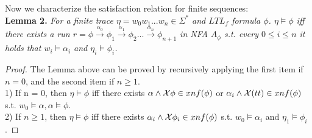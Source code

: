 Now we characterize the satisfaction relation for finite sequences: \\
{\bf Lemma 2.}  {\it For a finite trace $\eta = w_0w_1...w_n \in \Sigma^{*}$ and $LTL_f$ formula $\phi$. $\eta \models \phi$ iff there exists a run $r = \phi \overset{\alpha_0}{\rightarrow}\phi_1\overset{\alpha_1}{\rightarrow}\phi_2...\overset{\alpha_n}{\rightarrow}\phi_{n+1}$ in NFA $A_{\phi}$ s.t. every $0 \leq i \leq n$ it holds that $w_i \models \alpha_i$ and $\eta_i \models \phi_i $.}
\begin{proof}
The Lemma above can be proved by recursively applying the first item if $n = 0$, and the second item if $n \geq 1$. \\
1) If n = 0, then $\eta \models \phi$ iff there exists $ \alpha \wedge \mathcal{X}\phi \in xnf(\phi)$ or $\alpha_i \wedge \mathcal{X}(tt) \in xnf(\phi)$ s.t. $w_0 \models \alpha, \alpha \models \phi$.\\
2) If $n \geq 1$, then  $\eta \models \phi$ iff there exists  $ \alpha_i \wedge \mathcal{X}\phi_i \in xnf(\phi)$ s.t. $w_0 \models \alpha_i$ and $\eta_1 \models \phi_i $.


\end{proof}
